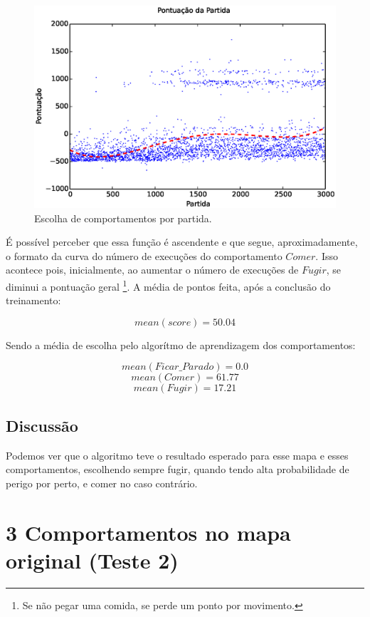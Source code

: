 \begin{figure}[H]
    \centering
    \includegraphics[width=\linewidth]{images/3_behaviors_small_map/match_scores____pol}
    \caption{Escolha de comportamentos por partida.}
    \label{img:3ComportamentosMapaPequeno:PontuacaoPorPartida}
\end{figure}

É possível perceber que essa função é ascendente e que segue, aproximadamente, o formato da curva do número de execuções do comportamento $ Comer $. Isso acontece pois, inicialmente, ao aumentar o número de execuções de $ Fugir $, se diminui a pontuação geral%
\footnote{Se não pegar uma comida, se perde um ponto por movimento.%
}. A média de pontos feita, após a conclusão do treinamento:

$$ mean \left( score \right) =50.04 $$

Sendo a média de escolha pelo algorítmo de aprendizagem dos comportamentos:

$$ mean \left( Ficar\_Parado \right) = 0.0 $$
$$ mean \left( Comer \right) = 61.77 $$
$$ mean \left( Fugir \right) = 17.21 $$


\subsection{Discussão}

Podemos ver que o algoritmo teve o resultado esperado para esse mapa e esses comportamentos, escolhendo sempre fugir, quando tendo alta probabilidade de perigo por perto, e comer no caso contrário.


\section{3 Comportamentos no mapa original (Teste 2)}


